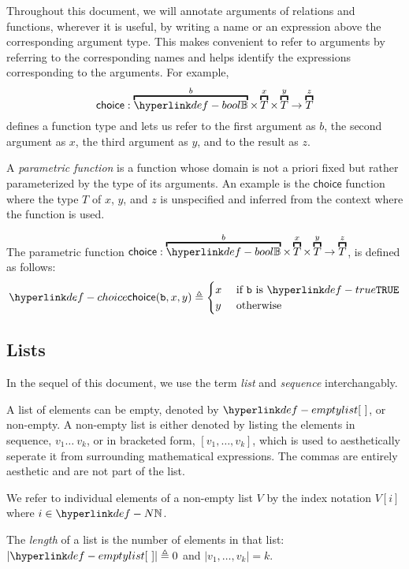 Throughout this document, we will annotate arguments of relations and functions, wherever it is useful,
by writing a name or an expression above the corresponding argument type.
This makes convenient to refer to arguments by referring to the corresponding names and helps identify
the expressions corresponding to the arguments.
For example,
\[
    \textsf{choice} : \overname{\Bool}{b} \times \overname{T}{x} \times \overname{T}{y} \rightarrow \overname{T}{z}
\]
defines a function type and lets us refer to the first argument as $b$, the second argument as $x$,
the third argument as $y$, and to the result as $z$.

A \emph{parametric function} is a function whose domain is not a priori fixed but rather
parameterized by the type of its arguments. An example is the $\textsf{choice}$ function where the type $T$ of
$x$, $y$, and $z$ is unspecified and inferred from the context where the function is used.

\hypertarget{def-choice}{}
\begin{definition}[Choice]
The parametric function $\textsf{choice} : \overname{\Bool}{b} \times \overname{T}{x} \times \overname{T}{y} \rightarrow \overname{T}{z}$,
is defined as follows:
\[
  \choice{\vb}{x}{y} \triangleq
  \begin{cases}
    x & \text{ if }\vb \text{ is }\True\\
    y & \text{ otherwise}\\
  \end{cases}
\]
\end{definition}

\subsection{Lists}
In the sequel of this document, we use the term \emph{list} and \emph{sequence} interchangably.

A list of elements \hypertarget{def-emptylist}{can be empty, denoted by $\emptylist$}, or non-empty.
A non-empty list is either denoted by listing the elements in sequence, $v_1 \ldots\ v_k$,
or in bracketed form, $[v_1,\ldots,v_k]$, which is used to aesthetically seperate it from surrounding mathematical expressions.
The commas are entirely aesthetic and are not part of the list.

We refer to individual elements of a non-empty list $V$ by the index notation $V[i]$ where $i\in\N$.

The \emph{length} of a list is the number of elements in that list:
$|\emptylist| \triangleq 0$ and $|v_1,\ldots,v_k|=k$.

